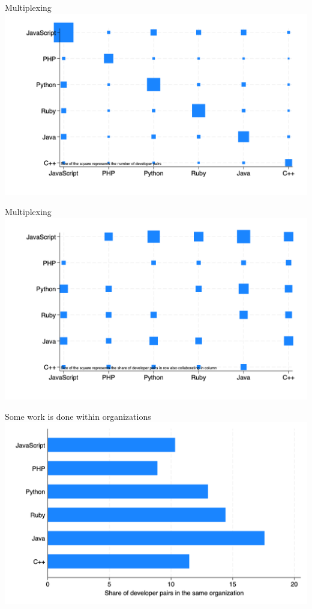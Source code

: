 \documentclass[
  ignorenonframetext,
  aspectratio=1610,
]{beamer}
\begin{document}
\begin{frame}{Multiplexing}
\protect\hypertarget{multiplexing}{}
\includegraphics{figures/language_matrix.png}
\end{frame}

\begin{frame}{Multiplexing}
\protect\hypertarget{multiplexing-1}{}
\includegraphics{figures/language_matrix_share.png}
\end{frame}

\begin{frame}{Some work is done within organizations}
\protect\hypertarget{some-work-is-done-within-organizations}{}
\includegraphics{figures/organization_share.png}
\end{frame}
\end{document}
